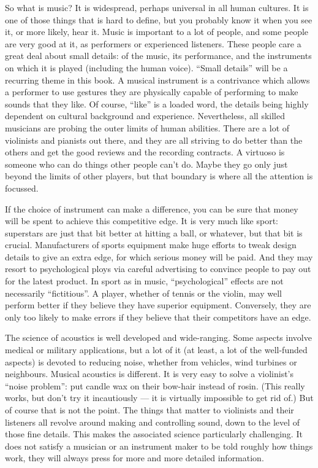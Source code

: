   So what is music? It is widespread, perhaps universal in all human cultures. 
  It is one of those things that is hard to define, but you probably know it 
  when you see it, or more likely, hear it. Music is important to a lot of 
  people, and some people are very good at it, as performers or experienced 
  listeners. These people care a great deal about small details: of the music, 
  its performance, and the instruments on which it is played (including the 
  human voice). ``Small details'' will be a recurring theme in this book. A 
  musical instrument is a contrivance which allows a performer to use gestures 
  they are physically capable of performing to make sounds that they like. Of 
  course, ``like'' is a loaded word, the details being highly dependent on 
  cultural background and experience. Nevertheless, all skilled musicians are 
  probing the outer limits of human abilities. There are a lot of violinists 
  and pianists out there, and they are all striving to do better than the 
  others and get the good reviews and the recording contracts. A virtuoso is 
  someone who can do things other people can't do. Maybe they go only just 
  beyond the limits of other players, but that boundary is where all the 
  attention is focussed. 

  If the choice of instrument can make a difference, you can be sure that money 
  will be spent to achieve this competitive edge. It is very much like sport: 
  superstars are just that bit better at hitting a ball, or whatever, but that 
  bit is crucial. Manufacturers of sports equipment make huge efforts to tweak 
  design details to give an extra edge, for which serious money will be paid. 
  And they may resort to psychological ploys via careful advertising to 
  convince people to pay out for the latest product. In sport as in music, 
  ``psychological'' effects are not necessarily ``fictitious''. A player, 
  whether of tennis or the violin, may well perform better if they believe they 
  have superior equipment. Conversely, they are only too likely to make errors 
  if they believe that their competitors have an edge. 

  The science of acoustics is well developed and wide-ranging. Some aspects 
  involve medical or military applications, but a lot of it (at least, a lot of 
  the well-funded aspects) is devoted to reducing noise, whether from vehicles, 
  wind turbines or neighbours. Musical acoustics is different. It is very easy 
  to solve a violinist's ``noise problem'': put candle wax on their bow-hair 
  instead of rosin. (This really works, but don't try it incautiously --- it is 
  virtually impossible to get rid of.) But of course that is not the point. The 
  things that matter to violinists and their listeners all revolve around 
  making and controlling sound, down to the level of those fine details. This 
  makes the associated science particularly challenging. It does not satisfy a 
  musician or an instrument maker to be told roughly how things work, they will 
  always press for more and more detailed information. 

